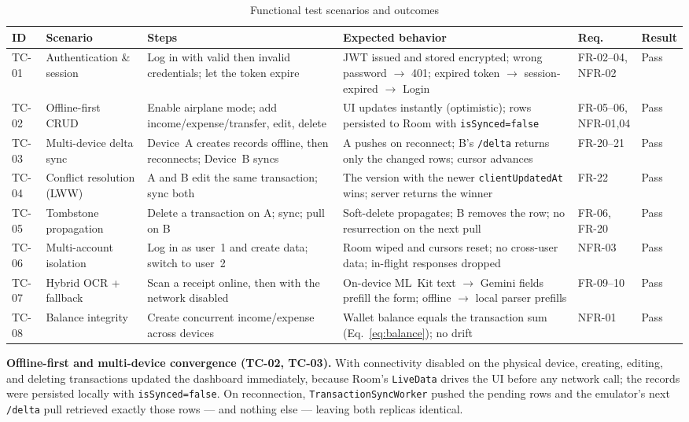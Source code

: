 \documentclass[13pt,a4paper]{extarticle}
\begin{document}
\begin{table}[H]
\centering
\caption{Functional test scenarios and outcomes}
\label{tab:scenarios}
\renewcommand{\arraystretch}{1.25}
\footnotesize
\begin{tabularx}{\textwidth}{@{}l p{2.0cm} X X p{1.5cm} l@{}}
\toprule
\textbf{ID} & \textbf{Scenario} & \textbf{Steps} & \textbf{Expected behavior} & \textbf{Req.} & \textbf{Result} \\
\midrule
TC-01 & Authentication \& session & Log in with valid then invalid credentials; let the token expire & JWT issued and stored encrypted; wrong password $\rightarrow$ 401; expired token $\rightarrow$ session-expired $\rightarrow$ Login & FR-02--04, NFR-02 & Pass \\
TC-02 & Offline-first CRUD & Enable airplane mode; add income/expense/transfer, edit, delete & UI updates instantly (optimistic); rows persisted to Room with \texttt{isSynced=false} & FR-05--06, NFR-01,04 & Pass \\
TC-03 & Multi-device delta sync & Device~A creates records offline, then reconnects; Device~B syncs & A pushes on reconnect; B's \texttt{/delta} returns only the changed rows; cursor advances & FR-20--21 & Pass \\
TC-04 & Conflict resolution (LWW) & A and B edit the same transaction; sync both & The version with the newer \texttt{clientUpdatedAt} wins; server returns the winner & FR-22 & Pass \\
TC-05 & Tombstone propagation & Delete a transaction on A; sync; pull on B & Soft-delete propagates; B removes the row; no resurrection on the next pull & FR-06, FR-20 & Pass \\
TC-06 & Multi-account isolation & Log in as user~1 and create data; switch to user~2 & Room wiped and cursors reset; no cross-user data; in-flight responses dropped & NFR-03 & Pass \\
TC-07 & Hybrid OCR + fallback & Scan a receipt online, then with the network disabled & On-device ML~Kit text $\rightarrow$ Gemini fields prefill the form; offline $\rightarrow$ local parser prefills & FR-09--10 & Pass \\
TC-08 & Balance integrity & Create concurrent income/expense across devices & Wallet balance equals the transaction sum (Eq.~\ref{eq:balance}); no drift & NFR-01 & Pass \\
\bottomrule
\end{tabularx}
\end{table}

\noindent\textbf{Offline-first and multi-device convergence (TC-02, TC-03).} With connectivity
disabled on the physical device, creating, editing, and deleting transactions updated the dashboard
immediately, because Room's \texttt{LiveData} drives the UI before any network call; the records were
persisted locally with \texttt{isSynced=false}. On reconnection, \texttt{TransactionSyncWorker}
pushed the pending rows and the emulator's next \texttt{/delta} pull retrieved exactly those rows ---
and nothing else --- leaving both replicas identical.
\end{document}
